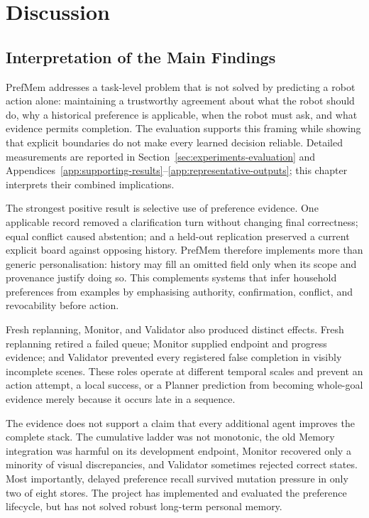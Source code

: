\section{Discussion}
\label{sec:discussion}

\subsection{Interpretation of the Main Findings}
\label{subsec:discussion-findings}

PrefMem addresses a task-level problem that is not solved by predicting a robot
action alone: maintaining a trustworthy agreement about what the robot should
do, why a historical preference is applicable, when the robot must ask, and
what evidence permits completion. The evaluation supports this framing while
showing that explicit boundaries do not make every learned decision reliable.
Detailed measurements are reported in Section~\ref{sec:experiments-evaluation}
and Appendices~\ref{app:supporting-results}--\ref{app:representative-outputs};
this chapter interprets their combined implications.

The strongest positive result is selective use of preference evidence. One
applicable record removed a clarification turn without changing final
correctness; equal conflict caused abstention; and a held-out replication
preserved a current explicit board against opposing history. PrefMem therefore
implements more than generic personalisation: history may fill an omitted field
only when its scope and provenance justify doing so. This complements systems
that infer household preferences from examples
\parencite{wu2023tidybot,wang2024apricot} by emphasising authority, confirmation,
conflict, and revocability before action.

Fresh replanning, Monitor, and Validator also produced distinct effects. Fresh
replanning retired a failed queue; Monitor supplied endpoint and progress
evidence; and Validator prevented every registered false completion in visibly
incomplete scenes. These roles operate at different temporal scales and prevent
an action attempt, a local success, or a Planner prediction from becoming
whole-goal evidence merely because it occurs late in a sequence.

The evidence does not support a claim that every additional agent improves the
complete stack. The cumulative ladder was not monotonic, the old Memory
integration was harmful on its development endpoint, Monitor recovered only a
minority of visual discrepancies, and Validator sometimes rejected correct
states. Most importantly, delayed preference recall survived mutation pressure
in only two of eight stores. The project has implemented and evaluated the
preference lifecycle, but has not solved robust long-term personal memory.

